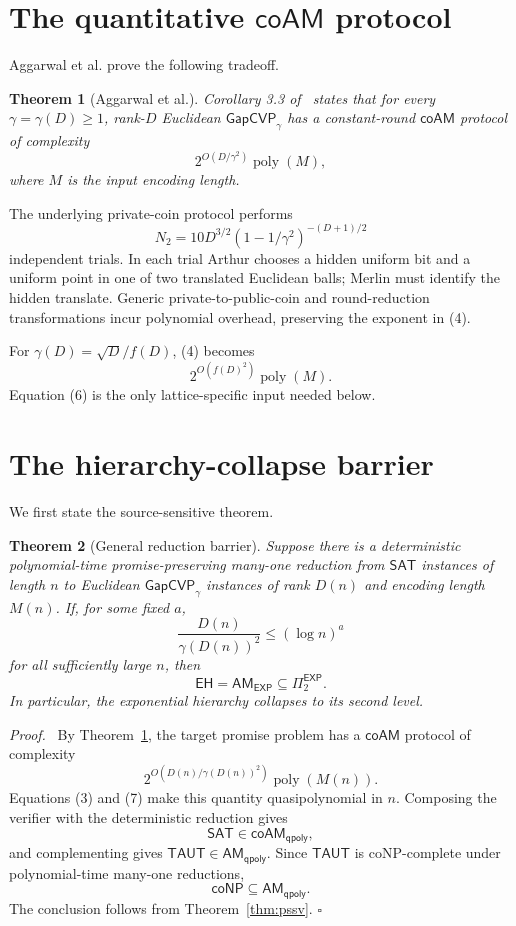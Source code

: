 \documentclass[11pt]{article}
\newtheorem{theorem}{Theorem}[section]
\newenvironment{proof}{\par\noindent\textit{Proof.}\ }{\hfill$\square$\par}
\newcommand{\GapCVP}{\mathsf{GapCVP}}
\newcommand{\coAM}{\mathsf{coAM}}
\newcommand{\AM}{\mathsf{AM}}
\newcommand{\qpoly}{\mathsf{qpoly}}
\newcommand{\EXP}{\mathsf{EXP}}
\newcommand{\EH}{\mathsf{EH}}
\newcommand{\poly}{\operatorname{poly}}
\newcommand{\TAUT}{\mathsf{TAUT}}
\begin{document}
\section{The quantitative \texorpdfstring{$\coAM$}{coAM} protocol}

Aggarwal et al. prove the following tradeoff.

\begin{theorem}[Aggarwal et al.]                                  \label{thm:coam}
Corollary 3.3 of~\cite{ABBGKLPV22} states that for every
$\gamma=\gamma(D)\ge1$, rank-$D$ Euclidean
$\GapCVP_\gamma$ has a constant-round $\coAM$ protocol of complexity
\[
  2^{O(D/\gamma^2)}\poly(M),                              \tag{4}
\]
where $M$ is the input encoding length.
\end{theorem}

The underlying private-coin protocol performs
\[
  N_2=10D^{3/2}(1-1/\gamma^2)^{-(D+1)/2}                 \tag{5}
\]
independent trials.  In each trial Arthur chooses a hidden uniform bit and a
uniform point in one of two translated Euclidean balls; Merlin must identify
the hidden translate.  Generic private-to-public-coin and round-reduction
transformations incur polynomial overhead, preserving the exponent in (4).

For $\gamma(D)=\sqrt D/f(D)$, (4) becomes
\[
  2^{O(f(D)^2)}\poly(M).                                  \tag{6}
\]
Equation (6) is the only lattice-specific input needed below.

\section{The hierarchy-collapse barrier}

We first state the source-sensitive theorem.

\begin{theorem}[General reduction barrier]                         \label{thm:general}
Suppose there is a deterministic polynomial-time promise-preserving many-one
reduction from $\mathsf{SAT}$ instances of length $n$ to Euclidean
$\GapCVP_{\gamma}$ instances of rank $D(n)$ and encoding length $M(n)$.
If, for some fixed $a$,
\[
  \frac{D(n)}{\gamma(D(n))^2}\le (\log n)^a              \tag{7}
\]
for all sufficiently large $n$, then
\[
  \EH=\AM_{\EXP}\subseteq\Pi_2^{\EXP}.
\]
In particular, the exponential hierarchy collapses to its second level.
\end{theorem}

\begin{proof}
By Theorem~\ref{thm:coam}, the target promise problem has a $\coAM$ protocol
of complexity
\[
  2^{O(D(n)/\gamma(D(n))^2)}\poly(M(n)).
\]
Equations (3) and (7) make this quantity quasipolynomial in $n$.  Composing
the verifier with the deterministic reduction gives
\[
  \mathsf{SAT}\in\coAM_{\qpoly},
\]
and complementing gives $\TAUT\in\AM_{\qpoly}$.  Since $\TAUT$ is
coNP-complete under polynomial-time many-one reductions,
\[
  \mathsf{coNP}\subseteq\AM_{\qpoly}.
\]
The conclusion follows from Theorem~\ref{thm:pssv}.
\end{proof}
\end{document}
